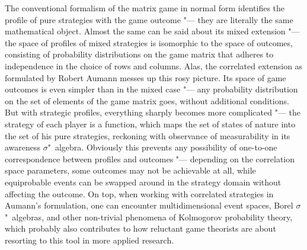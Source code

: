 The conventional formalism of the matrix game in normal form identifies the profile of pure strategies with the game outcome "--- they are literally the same mathematical object. Almost the same can be said about its mixed extension "--- the space of profiles of mixed strategies is isomorphic to the space of outcomes, consisting of probability distributions on the game matrix that adheres to independence in the choice of rows and columns. Alas, the correlated extension as formulated by Robert Aumann messes up this rosy picture. Its space of game outcomes is even simpler than in the mixed case "--- any probability distribution on the set of elements of the game matrix goes, without additional conditions. But with strategic profiles, everything sharply becomes more complicated "--- the strategy of each player is a function, which maps the set of states of nature into the set of his pure strategies, reckoning with observance of measurability in its awareness $\sigma$"~algebra. Obviously this prevents any possibility of one-to-one correspondence between profiles and outcomes "--- depending on the correlation space parameters, some outcomes may not be achievable at all, while equiprobable events can be swapped around in the strategy domain without affecting the outcome. On top, when working with correlated strategies in Aumann's formulation, one can encounter multidimensional event spaces, Borel $\sigma$"~algebras, and other non-trivial phenomena of Kolmogorov probability theory, which probably also contributes to how reluctant game theorists are about resorting to this tool in more applied research. %

